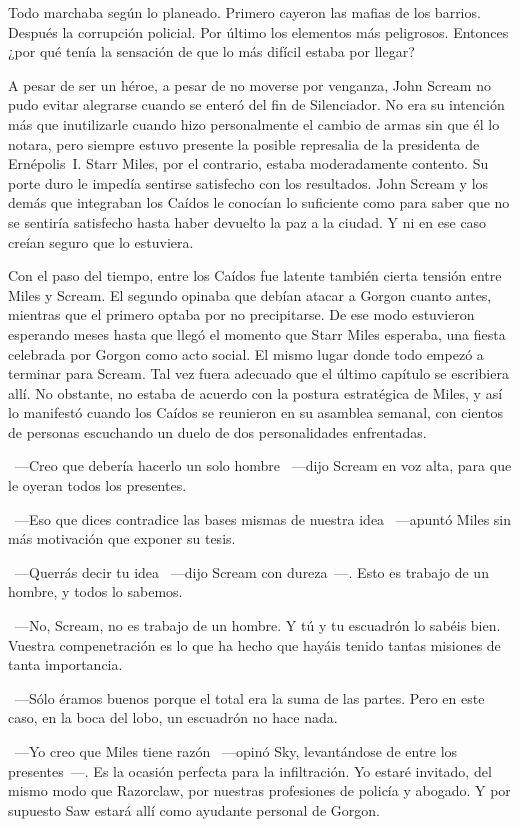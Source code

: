 Todo marchaba según lo planeado. Primero cayeron las mafias de los barrios. Después la corrupción policial. Por último los elementos más peligrosos. Entonces ¿por qué tenía la sensación de que lo más difícil estaba por llegar?

\fancyparbreak
A pesar de ser un héroe, a pesar de no moverse por venganza, John Scream no pudo evitar alegrarse cuando se enteró del fin de Silenciador. No era su intención más que inutilizarle cuando hizo personalmente el cambio de armas sin que él lo notara, pero siempre estuvo presente la posible represalia de la presidenta de Ernépolis~I. Starr Miles, por el contrario, estaba moderadamente contento. Su porte duro le impedía sentirse satisfecho con los resultados. John Scream y los demás que integraban los Caídos le conocían lo suficiente como para saber que no se sentiría satisfecho hasta haber devuelto la paz a la ciudad. Y ni en ese caso creían seguro que lo estuviera.

Con el paso del tiempo, entre los Caídos fue latente también cierta tensión entre Miles y Scream. El segundo opinaba que debían atacar a Gorgon cuanto antes, mientras que el primero optaba por no precipitarse. De ese modo estuvieron esperando meses hasta que llegó el momento que Starr Miles esperaba, una fiesta celebrada por Gorgon como acto social. El mismo lugar donde todo empezó a terminar para Scream. Tal vez fuera adecuado que el último capítulo se escribiera allí. No obstante, no estaba de acuerdo con la postura estratégica de Miles, y así lo manifestó cuando los Caídos se reunieron en su asamblea semanal, con cientos de personas escuchando un duelo de dos personalidades enfrentadas.

~---Creo que debería hacerlo un solo hombre ~---dijo Scream en voz alta, para que le oyeran todos los presentes.

~---Eso que dices contradice las bases mismas de nuestra idea ~---apuntó Miles sin más motivación que exponer su tesis.

~---Querrás decir tu idea ~---dijo Scream con dureza~---. Esto es trabajo de un hombre, y todos lo sabemos.

~---No, Scream, no es trabajo de un hombre. Y tú y tu escuadrón lo sabéis bien. Vuestra compenetración es lo que ha hecho que hayáis tenido tantas misiones de tanta importancia.

~---Sólo éramos buenos porque el total era la suma de las partes. Pero en este caso, en la boca del lobo, un escuadrón no hace nada.

~---Yo creo que Miles tiene razón ~---opinó Sky, levantándose de entre los presentes~---. Es la ocasión perfecta para la infiltración. Yo estaré invitado, del mismo modo que Razorclaw, por nuestras profesiones de policía y abogado. Y por supuesto Saw estará allí como ayudante personal de Gorgon.

